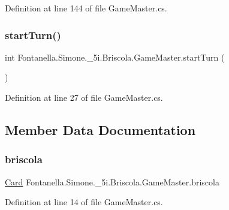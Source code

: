 Definition at line 144 of file Game\+Master.\+cs.

\hypertarget{class_fontanella_1_1_simone_1_1__5i_1_1_briscola_1_1_game_master_a43255b1c949556008efd7d22256fd294}{}\label{class_fontanella_1_1_simone_1_1__5i_1_1_briscola_1_1_game_master_a43255b1c949556008efd7d22256fd294} 
\subsubsection{\texorpdfstring{start\+Turn()}{startTurn()}}
{\footnotesize\ttfamily int Fontanella.\+Simone.\+\_\+5i.\+Briscola.\+Game\+Master.\+start\+Turn (\begin{DoxyParamCaption}{ }\end{DoxyParamCaption})}



Definition at line 27 of file Game\+Master.\+cs.



\subsection{Member Data Documentation}
\hypertarget{class_fontanella_1_1_simone_1_1__5i_1_1_briscola_1_1_game_master_a292123e911a73c41132d10ca7fcaf8fa}{}\label{class_fontanella_1_1_simone_1_1__5i_1_1_briscola_1_1_game_master_a292123e911a73c41132d10ca7fcaf8fa} 
\subsubsection{\texorpdfstring{briscola}{briscola}}
{\footnotesize\ttfamily \hyperlink{class_fontanella_1_1_simone_1_1__5i_1_1_briscola_1_1_card}{Card} Fontanella.\+Simone.\+\_\+5i.\+Briscola.\+Game\+Master.\+briscola}



Definition at line 14 of file Game\+Master.\+cs.

